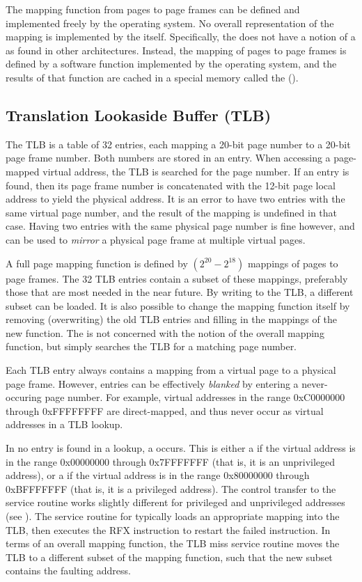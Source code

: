 The mapping function from pages to page frames can be defined and implemented freely by the operating system. No overall representation of the mapping is implemented by the \eco itself. Specifically, the \eco does not have a notion of a  as found in other architectures. Instead, the mapping of pages to page frames is defined by a software function implemented by the operating system, and the results of that function are cached in a special memory called the  ().

\subsection{Translation Lookaside Buffer (TLB)}

The TLB is a table of 32 entries, each mapping a 20-bit page number to a 20-bit page frame number. Both numbers are stored in an entry. When accessing a page-mapped virtual address, the TLB is searched for the page number. If an entry is found, then its page frame number is concatenated with the 12-bit page local address to yield the physical address. It is an error to have two entries with the same virtual page number, and the result of the mapping is undefined in that case. Having two entries with the same physical page number is fine however, and can be used to {\it mirror} a physical page frame at multiple virtual pages.

A full page mapping function is defined by $(2^{20} - 2^{18})$ mappings of pages to page frames. The 32 TLB entries contain a subset of these mappings, preferably those that are most needed in the near future. By writing to the TLB, a different subset can be loaded. It is also possible to change the mapping function itself by removing (overwriting) the old TLB entries and filling in the mappings of the new function.  The \eco is not concerned with the notion of the overall mapping function, but simply searches the TLB for a matching page number.

Each TLB entry always contains a mapping from a virtual page to a physical page frame. However, entries can be effectively {\it blanked} by entering a never-occuring page number. For example, virtual addresses in the range 0xC0000000 through 0xFFFFFFFF are direct-mapped, and thus never occur as virtual addresses in a TLB lookup.

In no entry is found in a lookup, a  occurs. This is either a  if the virtual address is in the range 0x00000000 through 0x7FFFFFFF (that is, it is an unprivileged address), or a  if the virtual address is in the range 0x80000000 through 0xBFFFFFFF (that is, it is a privileged address). The control transfer to the service routine works slightly different for privileged and unprivileged addresses (see ). The service routine for  typically loads an appropriate mapping into the TLB, then executes the RFX instruction to restart the failed instruction. In terms of an overall mapping function, the TLB miss service routine moves the TLB to a different subset of the mapping function, such that the new subset contains the faulting address.

